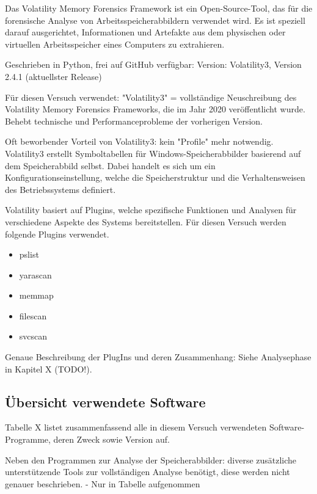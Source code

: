 Das Volatility Memory Forensics Framework ist ein Open-Source-Tool, das für die forensische Analyse von Arbeitsspeicherabbildern verwendet wird. Es ist speziell darauf ausgerichtet, Informationen und Artefakte aus dem physischen oder virtuellen Arbeitsspeicher eines Computers zu extrahieren.

Geschrieben in Python, frei auf GitHub verfügbar:	
Version: Volatility3, Version 2.4.1 (aktuellster Release)

Für diesen Versuch verwendet: "Volatility3"
= vollständige Neuschreibung des Volatility Memory Forensics Frameworks, die im Jahr 2020 veröffentlicht wurde. Behebt technische und Performanceprobleme der vorherigen Version.

Oft beworbender Vorteil von Volatility3: kein "Profile" mehr notwendig. Volatility3 erstellt Symboltabellen für Windows-Speicherabbilder basierend auf dem Speicherabbild selbst.
Dabei handelt es sich um ein Konfigurationseinstellung, welche die Speicherstruktur und die Verhaltensweisen des Betriebssystems definiert.

Volatility basiert auf Plugins, welche spezifische Funktionen und Analysen für verschiedene Aspekte des Systems bereitstellen. Für diesen Versuch werden folgende Plugins verwendet. 
\begin{itemize}
\item pslist	
\item yarascan		
\item memmap	 	
\item filescan
\item svcscan
\end{itemize}
		
Genaue Beschreibung der PlugIns und deren Zusammenhang: Siehe Analysephase in Kapitel X (TODO!).

\subsection*{Übersicht verwendete Software}

Tabelle X listet zusammenfassend alle in diesem Versuch verwendeten Software-Programme, deren Zweck sowie Version auf.

Neben den Programmen zur Analyse der Speicherabbilder: diverse zusätzliche unterstützende Tools zur vollständigen Analyse benötigt, diese werden nicht genauer beschrieben.
- Nur in Tabelle aufgenommen

